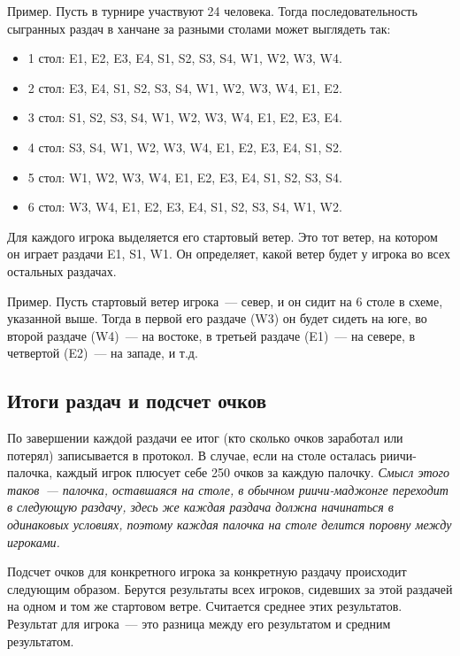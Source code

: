 \begin{additional}
\vspace{0.3cm}

Пример. Пусть в турнире участвуют 24 человека. Тогда последовательность сыгранных раздач в ханчане за разными столами может выглядеть так:

\begin{itemize}
	\item 1 стол: E1, E2, E3, E4, S1, S2, S3, S4, W1, W2, W3, W4.
	\item 2 стол: E3, E4, S1, S2, S3, S4, W1, W2, W3, W4, E1, E2.
	\item 3 стол: S1, S2, S3, S4, W1, W2, W3, W4, E1, E2, E3, E4.
	\item 4 стол: S3, S4, W1, W2, W3, W4, E1, E2, E3, E4, S1, S2.
	\item 5 стол: W1, W2, W3, W4, E1, E2, E3, E4, S1, S2, S3, S4.
	\item 6 стол: W3, W4, E1, E2, E3, E4, S1, S2, S3, S4, W1, W2.
\end{itemize}

\vspace{0.3cm}

Для каждого игрока выделяется его стартовый ветер. Это тот ветер, на котором он играет раздачи E1, S1, W1. Он определяет, какой ветер будет у игрока во всех остальных раздачах.

\vspace{0.3cm}

Пример. Пусть стартовый ветер игрока~--- север, и он сидит на 6 столе в схеме, указанной выше. Тогда в первой его раздаче (W3) он будет сидеть на юге, во второй раздаче (W4)~--- на востоке, в третьей раздаче (E1)~--- на севере, в четвертой (E2)~--- на западе, и т.д.

\subsection{Итоги раздач и подсчет очков}

По завершении каждой раздачи ее итог (кто сколько очков заработал или потерял) записывается в протокол. В случае, если на столе осталась риичи-палочка, каждый игрок плюсует себе 250 очков за каждую палочку. \textit{Смысл этого таков~--- палочка, оставшаяся на столе, в обычном риичи-маджонге переходит в следующую раздачу, здесь же каждая раздача должна начинаться в одинаковых условиях, поэтому каждая палочка на столе делится поровну между игроками.}

\vspace{0.3cm}

Подсчет очков для конкретного игрока за конкретную раздачу происходит следующим образом. Берутся результаты всех игроков, сидевших за этой раздачей на одном и том же стартовом ветре. Считается среднее этих результатов. Результат для игрока~--- это разница между его результатом и средним результатом.


\end{additional}
